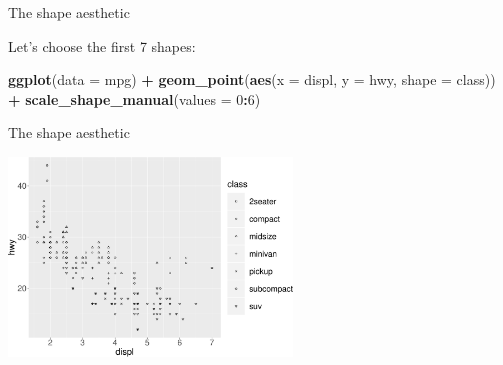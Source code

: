 \documentclass[ignorenonframetext,]{beamer}
\newenvironment{Shaded}{\begin{snugshade}}{\end{snugshade}}
\newcommand{\DataTypeTok}[1]{\textcolor[rgb]{0.13,0.29,0.53}{#1}}
\newcommand{\DecValTok}[1]{\textcolor[rgb]{0.00,0.00,0.81}{#1}}
\newcommand{\KeywordTok}[1]{\textcolor[rgb]{0.13,0.29,0.53}{\textbf{#1}}}
\newcommand{\NormalTok}[1]{#1}
\newcommand{\OperatorTok}[1]{\textcolor[rgb]{0.81,0.36,0.00}{\textbf{#1}}}
\newcommand{\StringTok}[1]{\textcolor[rgb]{0.31,0.60,0.02}{#1}}
\begin{document}
\begin{frame}[fragile]{The shape aesthetic}
\protect\hypertarget{the-shape-aesthetic-4}{}

Let's choose the first 7 shapes:

\begin{Shaded}
\begin{Highlighting}[]
\KeywordTok{ggplot}\NormalTok{(}\DataTypeTok{data =}\NormalTok{ mpg) }\OperatorTok{+}
\StringTok{  }\KeywordTok{geom_point}\NormalTok{(}\KeywordTok{aes}\NormalTok{(}\DataTypeTok{x =}\NormalTok{ displ, }\DataTypeTok{y =}\NormalTok{ hwy, }\DataTypeTok{shape =}\NormalTok{ class)) }\OperatorTok{+}
\StringTok{  }\KeywordTok{scale_shape_manual}\NormalTok{(}\DataTypeTok{values =} \DecValTok{0}\OperatorTok{:}\DecValTok{6}\NormalTok{)}
\end{Highlighting}
\end{Shaded}

\end{frame}

\begin{frame}{The shape aesthetic}
\protect\hypertarget{the-shape-aesthetic-5}{}

\begin{center}\includegraphics[height=200px]{data-visualization_files/figure-beamer/unnamed-chunk-18-1} \end{center}

\end{frame}
\end{document}
